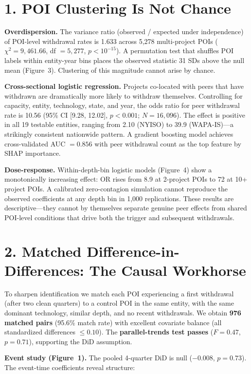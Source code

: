 \documentclass[10pt,letterpaper]{article}
\begin{document}
\section*{1. POI Clustering Is Not Chance}

\textbf{Overdispersion.} The variance ratio (observed / expected under independence) of POI-level withdrawal rates is 1.633 across 5{,}278 multi-project POIs ($\chi^2 = 9{,}461.66$, df $= 5{,}277$, $p < 10^{-15}$). A permutation test that shuffles POI labels within entity-year bins places the observed statistic 31 SDs above the null mean (Figure~3). Clustering of this magnitude cannot arise by chance.

\textbf{Cross-sectional logistic regression.} Projects co-located with peers that have withdrawn are dramatically more likely to withdraw themselves. Controlling for capacity, entity, technology, state, and year, the odds ratio for peer withdrawal rate is 10.56 (95\% CI [9.28, 12.02], $p < 0.001$; $N = 16{,}096$). The effect is positive in all 19 testable entities, ranging from 2.10 (NYISO) to 39.9 (WAPA-IS)---a strikingly consistent nationwide pattern. A gradient boosting model achieves cross-validated AUC $= 0.856$ with peer withdrawal count as the top feature by SHAP importance.

\textbf{Dose-response.} Within-depth-bin logistic models (Figure~4) show a monotonically increasing effect: OR rises from 8.9 at 2-project POIs to 72 at 10+ project POIs. A calibrated zero-contagion simulation cannot reproduce the observed coefficients at any depth bin in 1{,}000 replications. These results are descriptive---they cannot by themselves separate genuine peer effects from shared POI-level conditions that drive both the trigger and subsequent withdrawals.

\section*{2. Matched Difference-in-Differences: The Causal Workhorse}

To sharpen identification we match each POI experiencing a first withdrawal (after two clean quarters) to a control POI in the same entity, with the same dominant technology, similar depth, and no recent withdrawals. We obtain \textbf{976 matched pairs} (95.6\% match rate) with excellent covariate balance (all standardized differences $\leq 0.10$). The \textbf{parallel-trends test passes} ($F = 0.47$, $p = 0.71$), supporting the DiD assumption.

\textbf{Event study (Figure~1).} The pooled 4-quarter DiD is null ($-0.008$, $p = 0.73$). The event-time coefficients reveal structure:
\end{document}
